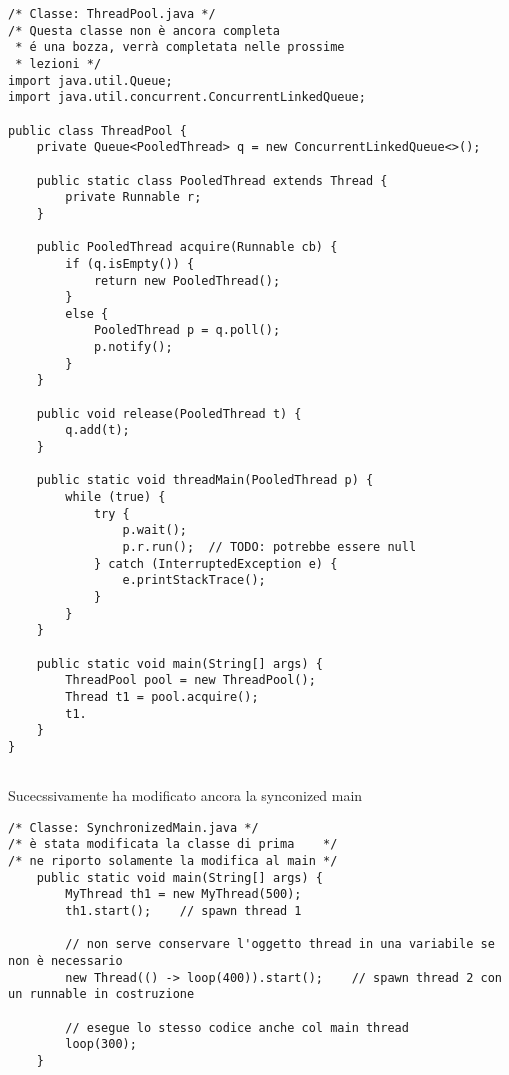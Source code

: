 \begin{lstlisting}[basicstyle=\small,]
/* Classe: ThreadPool.java */
/* Questa classe non è ancora completa 
 * é una bozza, verrà completata nelle prossime
 * lezioni */
import java.util.Queue;
import java.util.concurrent.ConcurrentLinkedQueue;

public class ThreadPool {
    private Queue<PooledThread> q = new ConcurrentLinkedQueue<>();

    public static class PooledThread extends Thread {
        private Runnable r;
    }

    public PooledThread acquire(Runnable cb) {
        if (q.isEmpty()) {
            return new PooledThread();
        }
        else {
            PooledThread p = q.poll();
            p.notify();
        }
    }

    public void release(PooledThread t) {
        q.add(t);
    }

    public static void threadMain(PooledThread p) {
        while (true) {
            try {
                p.wait();
                p.r.run();  // TODO: potrebbe essere null
            } catch (InterruptedException e) {
                e.printStackTrace();
            }
        }
    }

    public static void main(String[] args) {
        ThreadPool pool = new ThreadPool();
        Thread t1 = pool.acquire();
        t1.
    }
}


\end{lstlisting}




\noindent Sucecssivamente ha modificato ancora la synconized main

\begin{lstlisting}[basicstyle=\small,]
/* Classe: SynchronizedMain.java */
/* è stata modificata la classe di prima    */
/* ne riporto solamente la modifica al main */
    public static void main(String[] args) {
        MyThread th1 = new MyThread(500);
        th1.start();    // spawn thread 1

        // non serve conservare l'oggetto thread in una variabile se non è necessario
        new Thread(() -> loop(400)).start();    // spawn thread 2 con un runnable in costruzione

        // esegue lo stesso codice anche col main thread
        loop(300);  
    }

\end{lstlisting}










